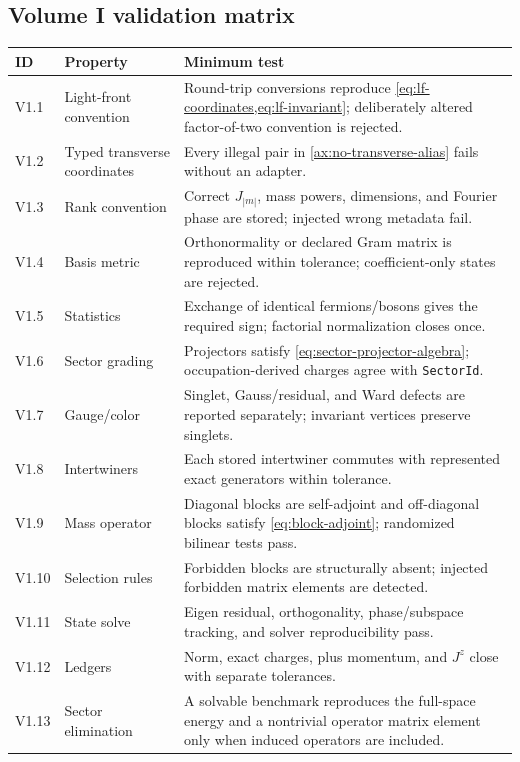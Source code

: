 \documentclass[11pt]{article}
\begin{document}
\subsection{Volume I validation matrix}

\begin{longtable}{L{0.07\textwidth}L{0.35\textwidth}L{0.48\textwidth}}
\toprule
ID & Property & Minimum test\\
\midrule
\endhead
V1.1 & Light-front convention & Round-trip conversions reproduce \cref{eq:lf-coordinates,eq:lf-invariant}; deliberately altered factor-of-two convention is rejected.\\
V1.2 & Typed transverse coordinates & Every illegal pair in \cref{ax:no-transverse-alias} fails without an adapter.\\
V1.3 & Rank convention & Correct \(J_{|m|}\), mass powers, dimensions, and Fourier phase are stored; injected wrong metadata fail.\\
V1.4 & Basis metric & Orthonormality or declared Gram matrix is reproduced within tolerance; coefficient-only states are rejected.\\
V1.5 & Statistics & Exchange of identical fermions/bosons gives the required sign; factorial normalization closes once.\\
V1.6 & Sector grading & Projectors satisfy \cref{eq:sector-projector-algebra}; occupation-derived charges agree with \texttt{SectorId}.\\
V1.7 & Gauge/color & Singlet, Gauss/residual, and Ward defects are reported separately; invariant vertices preserve singlets.\\
V1.8 & Intertwiners & Each stored intertwiner commutes with represented exact generators within tolerance.\\
V1.9 & Mass operator & Diagonal blocks are self-adjoint and off-diagonal blocks satisfy \cref{eq:block-adjoint}; randomized bilinear tests pass.\\
V1.10 & Selection rules & Forbidden blocks are structurally absent; injected forbidden matrix elements are detected.\\
V1.11 & State solve & Eigen residual, orthogonality, phase/subspace tracking, and solver reproducibility pass.\\
V1.12 & Ledgers & Norm, exact charges, plus momentum, and \(J^z\) close with separate tolerances.\\
V1.13 & Sector elimination & A solvable benchmark reproduces the full-space energy and a nontrivial operator matrix element only when induced operators are included.\\

\end{longtable}
\end{document}
